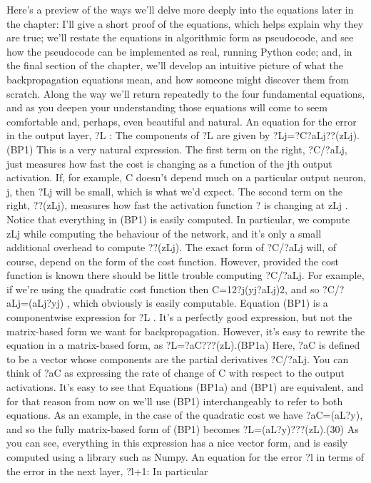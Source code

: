Here's a preview of the ways we'll delve more deeply into the equations later in the chapter: I'll give a short proof of the equations, which helps explain why they are true; we'll restate the equations in algorithmic form as pseudocode, and see how the pseudocode can be implemented as real, running Python code; and, in the final section of the chapter, we'll develop an intuitive picture of what the backpropagation equations mean, and how someone might discover them from scratch. Along the way we'll return repeatedly to the four fundamental equations, and as you deepen your understanding those equations will come to seem comfortable and, perhaps, even beautiful and natural.
An equation for the error in the output layer, ?L
: The components of ?L are given by 
?Lj=?C?aLj??(zLj).(BP1)
This is a very natural expression. The first term on the right, ?C/?aLj, just measures how fast the cost is changing as a function of the jth output activation. If, for example, C doesn't depend much on a particular output neuron, j, then ?Lj will be small, which is what we'd expect. The second term on the right, ??(zLj), measures how fast the activation function ? is changing at zLj
.
Notice that everything in (BP1) is easily computed. In particular, we compute zLj
while computing the behaviour of the network, and it's only a small additional overhead to compute ??(zLj). The exact form of ?C/?aLj will, of course, depend on the form of the cost function. However, provided the cost function is known there should be little trouble computing ?C/?aLj. For example, if we're using the quadratic cost function then C=12?j(yj?aLj)2, and so ?C/?aLj=(aLj?yj)
, which obviously is easily computable.
Equation (BP1) is a componentwise expression for ?L
. It's a perfectly good expression, but not the matrix-based form we want for backpropagation. However, it's easy to rewrite the equation in a matrix-based form, as 
?L=?aC???(zL).(BP1a)
Here, ?aC is defined to be a vector whose components are the partial derivatives ?C/?aLj. You can think of ?aC as expressing the rate of change of C with respect to the output activations. It's easy to see that Equations (BP1a) and (BP1) are equivalent, and for that reason from now on we'll use (BP1) interchangeably to refer to both equations. As an example, in the case of the quadratic cost we have ?aC=(aL?y), and so the fully matrix-based form of (BP1) becomes 
?L=(aL?y)???(zL).(30)
As you can see, everything in this expression has a nice vector form, and is easily computed using a library such as Numpy.
An equation for the error ?l
in terms of the error in the next layer, ?l+1: In particular 
